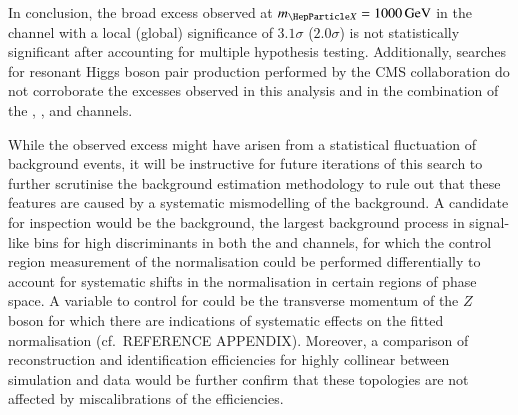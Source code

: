 %
%
%
%
%
%
%

In conclusion, the broad excess observed at $\mX = \SI{1000}{\GeV}$ in the
\bbtautau channel with a local (global) significance of $\num{3.1} \sigma$
($\num{2.0} \sigma$) is not statistically significant after accounting for
multiple hypothesis testing. Additionally, searches for resonant Higgs boson
pair production performed by the CMS collaboration do not corroborate the
excesses observed in this analysis and in the combination of the \bbbb,
\bbtautau, and \bbyy channels.

While the observed excess might have arisen from a statistical fluctuation of
background events, it will be instructive for future iterations of this search
to further scrutinise the background estimation methodology to rule out that
these features are caused by a systematic mismodelling of the background. A
candidate for inspection would be the \ZHF background, the largest background
process in signal-like bins for high \mX discriminants in both the \hadhad and
\lephad channels, for which the control region measurement of the \ZHF
normalisation could be performed differentially to account for systematic shifts
in the normalisation in certain regions of phase space. A variable to control
for could be the transverse momentum of the $Z$ boson for which there are
indications of systematic effects on the fitted normalisation (cf.\ REFERENCE
APPENDIX). Moreover, a comparison of reconstruction and identification
efficiencies for highly collinear \tauhadvis between simulation and data would
be further confirm that these topologies are not affected by miscalibrations of
the efficiencies.

